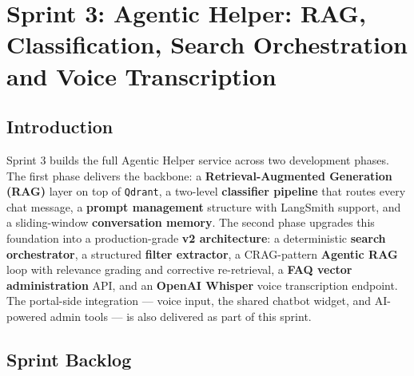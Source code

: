 \chapter{Sprint 3: Agentic Helper: RAG, Classification, Search Orchestration and Voice Transcription}

\section*{Introduction}

Sprint 3 builds the full Agentic Helper service across two development phases. The first phase
delivers the backbone: a \textbf{Retrieval-Augmented Generation (RAG)} layer on top of
\texttt{Qdrant}, a two-level \textbf{classifier pipeline} that routes every chat message, a
\textbf{prompt management} structure with LangSmith support, and a sliding-window
\textbf{conversation memory}. The second phase upgrades this foundation into a production-grade
\textbf{v2 architecture}: a deterministic \textbf{search orchestrator}, a structured
\textbf{filter extractor}, a CRAG-pattern \textbf{Agentic RAG} loop with relevance grading and
corrective re-retrieval, a \textbf{FAQ vector administration} API, and an \textbf{OpenAI Whisper}
voice transcription endpoint. The portal-side integration — voice input, the shared chatbot
widget, and AI-powered admin tools — is also delivered as part of this sprint.

\section{Sprint Backlog}

